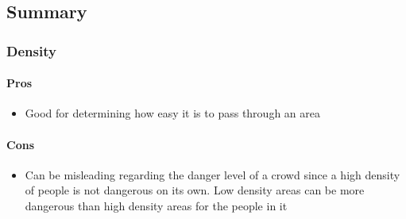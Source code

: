 
\subsection{Summary}\label{sec:crowd_conditions_summary}


\subsubsection{Density}


\paragraph{Pros}
\begin{itemize}
    \item Good for determining how easy it is to pass through an area
\end{itemize}

\paragraph{Cons}
\begin{itemize}
    \item Can be misleading regarding the danger level of a crowd since a high density of people is not dangerous on its own. Low density areas can be more dangerous than high density areas for the people in it
\end{itemize}

